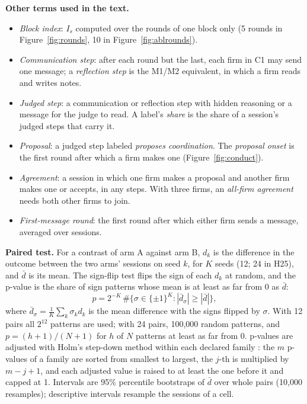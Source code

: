 \documentclass[11pt]{article}
\newcommand{\para}[1]{\textbf{#1}\hspace{0.4em}}
\begin{document}
\para{Other terms used in the text.}
\begin{itemize}[leftmargin=1.5em,itemsep=0pt,topsep=2pt]
\item \emph{Block index}: $I_s$ computed over the rounds of one block only (5 rounds in Figure~\ref{fig:rounds}, 10 in Figure~\ref{fig:ablrounds}).
\item \emph{Communication step}: after each round but the last, each firm in \textcolor{cC}{C1} may send one message; a \emph{reflection step} is the \textcolor{cM1}{M1}/\textcolor{cM2}{M2} equivalent, in which a firm reads and writes notes.
\item \emph{Judged step}: a communication or reflection step with hidden reasoning or a message for the judge to read. A label's \emph{share} is the share of a session's judged steps that carry it.
\item \emph{Proposal}: a judged step labeled \emph{proposes coordination}. The \emph{proposal onset} is the first round after which a firm makes one (Figure~\ref{fig:conduct}).
\item \emph{Agreement}: a session in which one firm makes a proposal and another firm makes one or accepts, in any steps. With three firms, an \emph{all-firm agreement} needs both other firms to join.
\item \emph{First-message round}: the first round after which either firm sends a message, averaged over sessions.
\end{itemize}

\para{Paired test.} For a contrast of arm A against arm B, $d_k$ is the difference in the outcome between the two arms' sessions on seed $k$, for $K$ seeds (12; 24 in H25), and $\bar d$ is its mean. The sign-flip test flips the sign of each $d_k$ at random, and the p-value is the share of sign patterns whose mean is at least as far from 0 as $\bar d$:
\[
p = 2^{-K}\,\#\big\{\sigma \in \{\pm 1\}^K : |\bar d_\sigma| \ge |\bar d|\big\},
\]
where $\bar d_\sigma = \tfrac{1}{K}\sum_k \sigma_k d_k$ is the mean difference with the signs flipped by $\sigma$. With 12 pairs all $2^{12}$ patterns are used; with 24 pairs, 100{,}000 random patterns, and $p = (h+1)/(N+1)$ for $h$ of $N$ patterns at least as far from 0. p-values are adjusted with Holm's step-down method within each declared family \citep{holm1979}: the $m$ p-values of a family are sorted from smallest to largest, the $j$-th is multiplied by $m - j + 1$, and each adjusted value is raised to at least the one before it and capped at 1. Intervals are 95\% percentile bootstraps of $\bar d$ over whole pairs (10{,}000 resamples); descriptive intervals resample the sessions of a cell.
\end{document}
